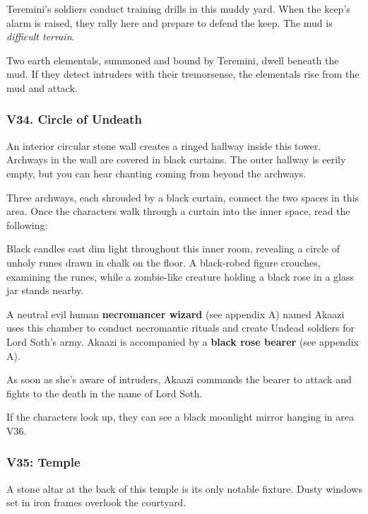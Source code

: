 \documentclass[10pt,a4paper,twoside,bg=print,twocolumn,openany,nodeprecatedcode]{dndbook}
\begin{document}
Teremini's soldiers conduct training drills in this muddy yard. When the keep's alarm is raised, they rally here and prepare to defend the keep. The mud is \textit{difficult terrain}.

Two earth elementals, summoned and bound by Teremini, dwell beneath the mud. If they detect intruders with their tremorsense, the elementals rise from the mud and attack.

\subsubsection{V34. Circle of Undeath}
\begin{DndReadAloud}{}
An interior circular stone wall creates a ringed hallway inside this tower. Archways in the wall are covered in black curtains. The outer hallway is eerily empty, but you can hear chanting coming from beyond the archways.

\end{DndReadAloud}

Three archways, each shrouded by a black curtain, connect the two spaces in this area. Once the characters walk through a curtain into the inner space, read the following:

\begin{DndReadAloud}{}
Black candles cast dim light throughout this inner room, revealing a circle of unholy runes drawn in chalk on the floor. A black-robed figure crouches, examining the runes, while a zombie-like creature holding a black rose in a glass jar stands nearby.

\end{DndReadAloud}

A neutral evil human \textbf{necromancer wizard} (see appendix A) named Akaazi uses this chamber to conduct necromantic rituals and create Undead soldiers for Lord Soth's army. Akaazi is accompanied by a \textbf{black rose bearer} (see appendix A).

As soon as she's aware of intruders, Akaazi commands the bearer to attack and fights to the death in the name of Lord Soth.

If the characters look up, they can see a black moonlight mirror hanging in area V36.

\subsubsection{V35: Temple}
\begin{DndReadAloud}{}
A stone altar at the back of this temple is its only notable fixture. Dusty windows set in iron frames overlook the courtyard.

\end{DndReadAloud}
\end{document}
